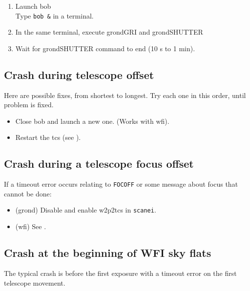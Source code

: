 \documentclass[11pt,fleqn,a4paper]{book}
\begin{document}
\begin{enumerate}
\begin{enumerate}
\begin{enumerate}
                   Find them by typing \texttt{ps gaux | grep bob} in a terminal).\\
                   Kill them with \texttt{kill -9 <pid>} where \texttt{<pid>} is the job number.
             \item Launch \gls{bob}\\  
                   Type \texttt{bob \&} in a terminal.
             \item In the same terminal, execute \gls{grondGRI} and \gls{grondSHUTTER}
             \item Wait for \gls{grondSHUTTER} command to end (10 s to 1 min).
             \end{enumerate}
  \end{enumerate}
\end{enumerate}
\newpage

\subsection{Crash during telescope offset}

Here are possible fixes, from shortest to longest.  Try each one in this
order, until problem is fixed.
\begin{itemize}
  \item Close \gls{bob} and launch a new one. (Works with \gls{wfi}).
  \item Restart the \gls{tcs} (see ).
\end{itemize}

\subsection{Crash during a telescope focus offset}
If a timeout error occurs relating to \texttt{FOCOFF} or some message about
\gls{focus} that cannot be done:
\begin{itemize}
  \item (\gls{grond}) Disable and enable \gls{w2p2tcs} in \texttt{scanei}.
  \item (\gls{wfi}) See .
\end{itemize}

\subsection{Crash at the beginning of WFI sky flats}

The typical crash is before the first exposure with a timeout error on the first telescope movement.
\end{document}
